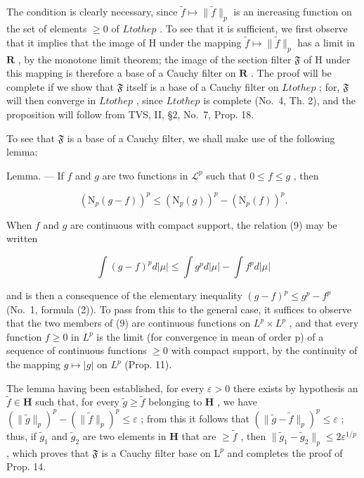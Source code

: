 The condition is clearly necessary, since \(\widetilde{f} \mapsto \| \widetilde{f} \|_p\) is an increasing function on the set of elements \(\geqslant 0\) of \(L to the p\) . To see that it is sufficient, we first observe that it implies that the image of H under the mapping \(\widetilde{f} \mapsto \| \widetilde{f} \|_p\) has a limit in \(\mathbf{R}\) , by the monotone limit theorem; the image of the section filter \(\mathfrak{F}\) of H under this mapping is therefore a base of a Cauchy filter on \(\mathbf{R}\) . The proof will be complete if we show that \(\mathfrak{F}\) itself is a base of a Cauchy filter on \(L to the p\) ; for, \(\mathfrak{F}\) will then converge in \(L to the p\) , since \(L to the p\) is complete (No.~4, Th. 2), and the proposition will follow from TVS, II, §2, No.~7, Prop. 18.

To see that \(\mathfrak{F}\) is a base of a Cauchy filter, we shall make use of the following lemma:

Lemma. --- If \(f\) and \(g\) are two functions in \(\mathcal{L}^p\) such that \(0 \leqslant f \leqslant g\) , then

\[
\left(\mathrm{N} _ {p} (g - f)\right) ^ {p} \leqslant \left(\mathrm{N} _ {p} (g)\right) ^ {p} - \left(\mathrm{N} _ {p} (f)\right) ^ {p}.\tag{9}
\]

When \(f\) and \(g\) are continuous with compact support, the relation (9) may be written

\[
\int (g - f) ^ {p} d | \mu | \leqslant \int g ^ {p} d | \mu | - \int f ^ {p} d | \mu |
\]

and is then a consequence of the elementary inequality \((g - f)^{p} \leqslant g^{p} - f^{p}\) (No.~1, formula (2)). To pass from this to the general case, it suffices to observe that the two members of (9) are continuous functions on \(L^{p} \times L^{p}\) , and that every function \(f \geqslant 0\) in \(L^{p}\) is the limit (for convergence in mean of order p) of a sequence of continuous functions \(\geqslant 0\) with compact support, by the continuity of the mapping \(g \mapsto |g|\) on \(L^{p}\) (Prop. 11).

The lemma having been established, for every \(\varepsilon > 0\) there exists by hypothesis an \(\widetilde{f} \in \mathbf{H}\) such that, for every \(\widetilde{g} \geqslant \widetilde{f}\) belonging to \(\mathbf{H}\) , we have \((\|\widetilde{g}\|_p)^p - (\|\widetilde{f}\|_p)^p \leqslant \varepsilon\) ; from this it follows that \((\|\widetilde{g} - \widetilde{f}\|_p)^p \leqslant \varepsilon\) ; thus, if \(\widetilde{g}_1\) and \(\widetilde{g}_2\) are two elements in \(\mathbf{H}\) that are \(\geqslant \widetilde{f}\) , then \(\|\widetilde{g}_1 - \widetilde{g}_2\|_p \leqslant 2\varepsilon^{1/p}\) , which proves that \(\mathfrak{F}\) is a Cauchy filter base on \(\mathrm{L}^p\) and completes the proof of Prop. 14.


